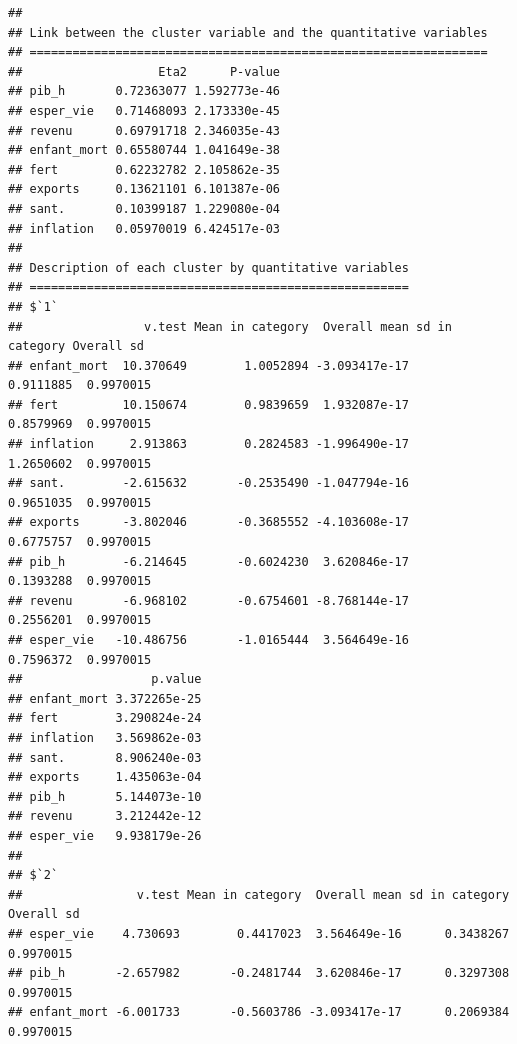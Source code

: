 \documentclass[
]{article}
\newenvironment{Shaded}{}{}
\newcommand{\AttributeTok}[1]{#1}
\newcommand{\DecValTok}[1]{#1}
\newcommand{\FunctionTok}[1]{#1}
\newcommand{\NormalTok}[1]{#1}
\newcommand{\OtherTok}[1]{\textcolor[rgb]{1.00,0.25,0.00}{#1}}
\newcommand{\SpecialCharTok}[1]{\textcolor[rgb]{0.00,0.50,0.50}{#1}}
\begin{document}
\begin{Shaded}
\end{Shaded}

\begin{verbatim}
## 
## Link between the cluster variable and the quantitative variables
## ================================================================
##                   Eta2      P-value
## pib_h       0.72363077 1.592773e-46
## esper_vie   0.71468093 2.173330e-45
## revenu      0.69791718 2.346035e-43
## enfant_mort 0.65580744 1.041649e-38
## fert        0.62232782 2.105862e-35
## exports     0.13621101 6.101387e-06
## sant.       0.10399187 1.229080e-04
## inflation   0.05970019 6.424517e-03
## 
## Description of each cluster by quantitative variables
## =====================================================
## $`1`
##                 v.test Mean in category  Overall mean sd in category Overall sd
## enfant_mort  10.370649        1.0052894 -3.093417e-17      0.9111885  0.9970015
## fert         10.150674        0.9839659  1.932087e-17      0.8579969  0.9970015
## inflation     2.913863        0.2824583 -1.996490e-17      1.2650602  0.9970015
## sant.        -2.615632       -0.2535490 -1.047794e-16      0.9651035  0.9970015
## exports      -3.802046       -0.3685552 -4.103608e-17      0.6775757  0.9970015
## pib_h        -6.214645       -0.6024230  3.620846e-17      0.1393288  0.9970015
## revenu       -6.968102       -0.6754601 -8.768144e-17      0.2556201  0.9970015
## esper_vie   -10.486756       -1.0165444  3.564649e-16      0.7596372  0.9970015
##                  p.value
## enfant_mort 3.372265e-25
## fert        3.290824e-24
## inflation   3.569862e-03
## sant.       8.906240e-03
## exports     1.435063e-04
## pib_h       5.144073e-10
## revenu      3.212442e-12
## esper_vie   9.938179e-26
## 
## $`2`
##                v.test Mean in category  Overall mean sd in category Overall sd
## esper_vie    4.730693        0.4417023  3.564649e-16      0.3438267  0.9970015
## pib_h       -2.657982       -0.2481744  3.620846e-17      0.3297308  0.9970015
## enfant_mort -6.001733       -0.5603786 -3.093417e-17      0.2069384  0.9970015

\end{verbatim}
\end{document}
